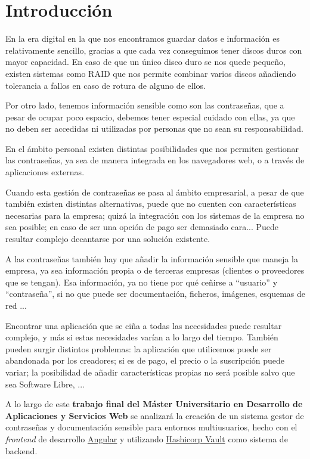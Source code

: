 \documentclass{\ClassPath/viu-tfm-template}
\begin{document}
\tableofcontents


\chapter{Introducción}
En la era digital en la que nos encontramos guardar datos e información es relativamente sencillo, gracias a que cada vez conseguimos tener discos duros con mayor capacidad. En caso de que un único disco duro se nos quede pequeño, existen sistemas como RAID que nos permite combinar varios discos añadiendo tolerancia a fallos en caso de rotura de alguno de ellos.

Por otro lado, tenemos información sensible como son las contraseñas, que a pesar de ocupar poco espacio, debemos tener especial cuidado con ellas, ya que no deben ser accedidas ni utilizadas por personas que no sean su responsabilidad.

En el ámbito personal existen distintas posibilidades que nos permiten gestionar las contraseñas, ya sea de manera integrada en los navegadores web, o a través de aplicaciones externas.

Cuando esta gestión de contraseñas se pasa al ámbito empresarial, a pesar de que también existen distintas alternativas, puede que no cuenten con características necesarias para la empresa; quizá la integración con los sistemas de la empresa no sea posible; en caso de ser una opción de pago ser demasiado cara... Puede resultar complejo decantarse por una solución existente.

A las contraseñas también hay que añadir la información sensible que maneja la empresa, ya sea información propia o de terceras empresas (clientes o proveedores que se tengan). Esa información, ya no tiene por qué ceñirse a “usuario” y “contraseña”, si no que puede ser documentación, ficheros, imágenes, esquemas de red ...

Encontrar una aplicación que se ciña a todas las necesidades puede resultar complejo, y más si estas necesidades varían a lo largo del tiempo. También pueden surgir distintos problemas: la aplicación que utilicemos puede ser abandonada por los creadores; si es de pago, el precio o la suscripción puede variar; la posibilidad de añadir características propias no será posible salvo que sea Software Libre, ...

A lo largo de este \textbf{trabajo final del Máster Universitario en Desarrollo de Aplicaciones y Servicios Web} se analizará la creación de un sistema gestor de contraseñas y documentación sensible para entornos multiusuarios, hecho con el \textit{frontend} de desarrollo \href{https://angular.io/}{Angular} y utilizando  \href{https://www.vaultproject.io/}{Hashicorp Vault} como sistema de backend.
\end{document}
